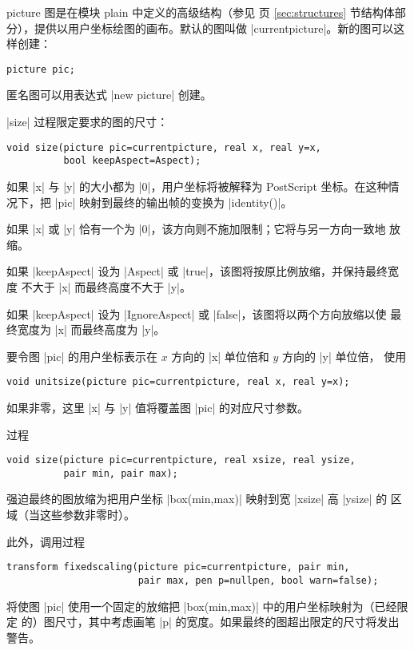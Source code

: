 \documentclass[nofonts,CJKnormalspaces]{ctexbook}[2009/05/20]
\makeatletter
\newenvironment{typelist}{\itemize
  \let\old@item\@item
  \def\@item[##1]{\expandafter\old@item[\ttfamily\color{type!50!black}##1]}}
{\enditemize}
\newcommand*\prgname[1]{\textsf{#1}}
\makeatother
\begin{document}
\begin{typelist}
\item[picture]
图是在模块 \prgname{plain} 中定义的高级结构（参见 \pageref{sec:structures} 页
\ref{sec:structures} 节结构体部分），提供以用户坐标绘图的画布。默认的图叫做
|currentpicture|。新的图可以这样创建：
\begin{lstlisting}
picture pic;
\end{lstlisting}
匿名图可以用表达式 |new picture| 创建。

|size| 过程限定要求的图的尺寸：
\begin{lstlisting}
void size(picture pic=currentpicture, real x, real y=x,
          bool keepAspect=Aspect);
\end{lstlisting}
如果 |x| 与 |y| 的大小都为 |0|，用户坐标将被解释为 \prgname{PostScript}
坐标。在这种情况下，把 |pic| 映射到最终的输出帧的变换为 |identity()|。

如果 |x| 或 |y| 恰有一个为 |0|，该方向则不施加限制；它将与另一方向一致地
放缩。

如果 |keepAspect| 设为 |Aspect| 或 |true|，该图将按原比例放缩，并保持最终宽度
不大于 |x| 而最终高度不大于 |y|。

如果 |keepAspect| 设为 |IgnoreAspect| 或 |false|，该图将以两个方向放缩以使
最终宽度为 |x| 而最终高度为 |y|。

要令图 |pic| 的用户坐标表示在 $x$ 方向的 |x| 单位倍和 $y$ 方向的 |y| 单位倍，
使用
\begin{lstlisting}
void unitsize(picture pic=currentpicture, real x, real y=x);
\end{lstlisting}
如果非零，这里 |x| 与 |y| 值将覆盖图 |pic| 的对应尺寸参数。

过程
\begin{lstlisting}
void size(picture pic=currentpicture, real xsize, real ysize,
          pair min, pair max);
\end{lstlisting}
强迫最终的图放缩为把用户坐标 |box(min,max)| 映射到宽 |xsize| 高 |ysize| 的
区域（当这些参数非零时）。

此外，调用过程
\begin{lstlisting}
transform fixedscaling(picture pic=currentpicture, pair min,
                       pair max, pen p=nullpen, bool warn=false);
\end{lstlisting}
将使图 |pic| 使用一个固定的放缩把 |box(min,max)| 中的用户坐标映射为（已经限定
的）图尺寸，其中考虑画笔 |p| 的宽度。如果最终的图超出限定的尺寸将发出警告。


\end{typelist}
\end{document}
